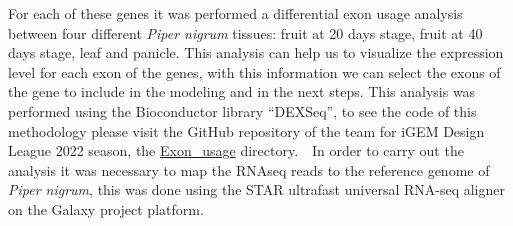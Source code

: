 \documentclass[12pt]{article}
\begin{document}
	For each of these genes it was performed a differential exon usage analysis between four different \textit{Piper nigrum} tissues: fruit at 20 days stage, fruit at 40 days stage, leaf and panicle. This analysis can help us to visualize the expression level for each exon of the genes, with this information we can select the exons of the gene to include in the modeling and in the next steps. This analysis was performed using the Bioconductor library ``DEXSeq'', to see the code of this methodology please visit the GitHub repository of the team for iGEM Design League 2022 season, the \href{https://github.com/GerardoCMM/Synthetic-Biobots-IGEM-DL-2022/tree/main/Exon_usage}{Exon\_usage} directory.\cite{bioconductor,dexseq,dexseq_2}\ \ In order to carry out the analysis it was necessary to map the RNAseq reads to the reference genome of \textit{Piper nigrum}, this was done using the STAR ultrafast universal RNA-seq aligner on the Galaxy project platform. \cite{genome,star,galaxy}
	
\end{document}
